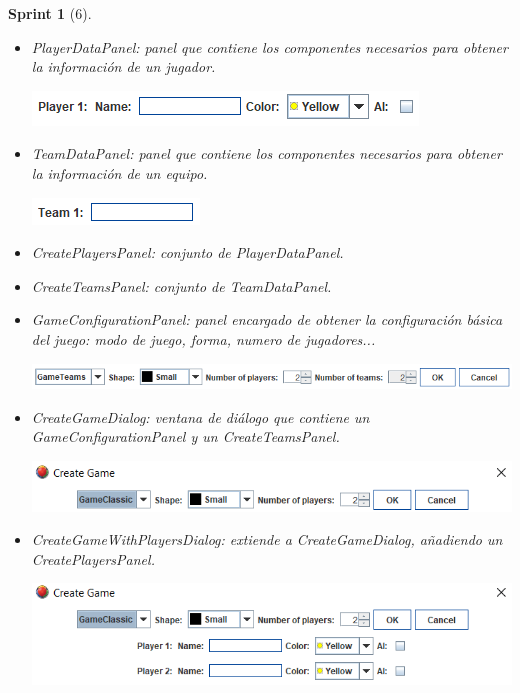 \documentclass[12pt,a4paper,openright]{book}
\theoremstyle{break}
\newtheorem*{sprint}{Sprint}
\begin{document}
\begin{sprint}[6]
\begin{itemize}
\item \textit{PlayerDataPanel}: panel que contiene los componentes necesarios para obtener la información de un jugador.
\begin{center}
\includegraphics[scale=1]{player-data-panel.png}
\end{center}
\item \textit{TeamDataPanel}: panel que contiene los componentes necesarios para obtener la información de un equipo.
\begin{center}
\includegraphics[scale=1]{team-data-panel.png}
\end{center}
\item \textit{CreatePlayersPanel}: conjunto de \textit{PlayerDataPanel}.
\item \textit{CreateTeamsPanel}: conjunto de \textit{TeamDataPanel}.
\item \textit{GameConfigurationPanel}: panel encargado de obtener la configuración básica del juego: modo de juego, forma, numero de jugadores...
\begin{center}
\includegraphics[scale=0.75]{game-config-panel.png}
\end{center}
\item \textit{CreateGameDialog}: ventana de diálogo que contiene un \textit{GameConfigurationPanel} y un \textit{CreateTeamsPanel}.
\begin{center}
\includegraphics[scale=0.8]{create-game-sprint6.png}
\end{center}
\item \textit{CreateGameWithPlayersDialog}: extiende a \textit{CreateGameDialog}, añadiendo un \textit{CreatePlayersPanel}.
\begin{center}
\includegraphics[scale=0.75]{create-game-players-sprint6.png}
\end{center}
\end{itemize}



\end{sprint}
\end{document}
